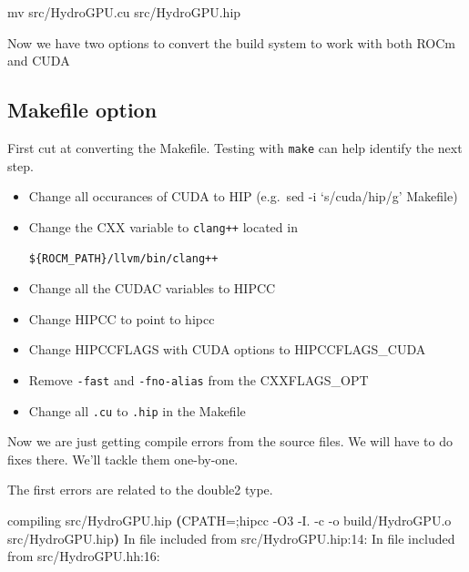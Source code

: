 \documentclass[
]{article}
\providecommand{\tightlist}{%
  \setlength{\itemsep}{0pt}\setlength{\parskip}{0pt}}
\let\oldtexttt\texttt
\renewcommand{\texttt}[1]{
  \colorbox{Light}{\oldtexttt{#1}}
}
\newenvironment{Shaded}{}{}
\newcommand{\ExtensionTok}[1]{#1}
\newcommand{\FunctionTok}[1]{\textcolor[rgb]{0.02,0.16,0.49}{#1}}
\newcommand{\KeywordTok}[1]{\textcolor[rgb]{0.00,0.44,0.13}{\textbf{#1}}}
\newcommand{\NormalTok}[1]{#1}
\newcommand{\VariableTok}[1]{\textcolor[rgb]{0.10,0.09,0.49}{#1}}
\providecommand{\tightlist}{%
  \setlength{\itemsep}{0pt}\setlength{\parskip}{0pt}}
\begin{document}
\begin{Shaded}
\begin{Highlighting}[]
\FunctionTok{mv}\NormalTok{ src/HydroGPU.cu src/HydroGPU.hip}
\end{Highlighting}
\end{Shaded}

Now we have two options to convert the build system to work with both
ROCm and CUDA

\hypertarget{makefile-option}{%
\subsection{Makefile option}\label{makefile-option}}

First cut at converting the Makefile. Testing with \texttt{make} can
help identify the next step.

\begin{itemize}
\tightlist
\item
  Change all occurances of CUDA to HIP (e.g.~sed -i `s/cuda/hip/g'
  Makefile)
\item
  Change the CXX variable to \texttt{clang++} located in
  \texttt{\$\{ROCM\_PATH\}/llvm/bin/clang++}
\item
  Change all the CUDAC variables to HIPCC
\item
  Change HIPCC to point to hipcc
\item
  Change HIPCCFLAGS with CUDA options to HIPCCFLAGS\_CUDA
\item
  Remove \texttt{-fast} and \texttt{-fno-alias} from the CXXFLAGS\_OPT
\item
  Change all \texttt{.cu} to \texttt{.hip} in the Makefile
\end{itemize}

Now we are just getting compile errors from the source files. We will
have to do fixes there. We'll tackle them one-by-one.

The first errors are related to the double2 type.

\begin{Shaded}
\begin{Highlighting}[]
\ExtensionTok{compiling}\NormalTok{ src/HydroGPU.hip}
\KeywordTok{(}\VariableTok{CPATH=}\NormalTok{;}\ExtensionTok{hipcc}\NormalTok{ {-}O3 {-}I.  {-}c {-}o build/HydroGPU.o src/HydroGPU.hip}\KeywordTok{)}
\ExtensionTok{In}\NormalTok{ file included from src/HydroGPU.hip:14:}
\ExtensionTok{In}\NormalTok{ file included from src/HydroGPU.hh:16:}
\end{Highlighting}
\end{Shaded}
\end{document}
